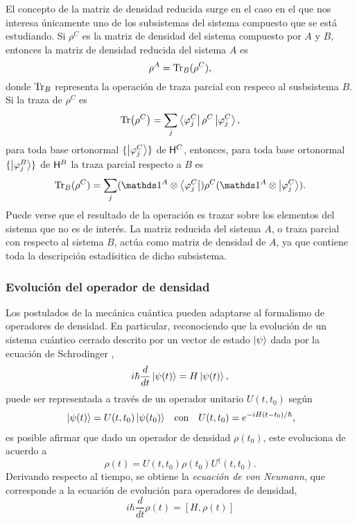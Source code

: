 El concepto de la matriz de densidad reducida surge en el caso en el que nos interesa únicamente uno de los subsistemas del sistema compuesto que se está estudiando. Si $\rho^{C}$ es la matriz de densidad del sistema compuesto por $A$ y $B$, entonces la matriz de densidad reducida del sistema $A$ es
\begin{equation*}
    \rho^{A}=\Tr_{B}(\rho^{C}),
\end{equation*}
donde $\Tr_{B}$ representa la operación de traza parcial con respeco al susbsistema $B$. Si la traza de $\rho^{C}$ es 
\begin{equation*}
    \Tr(\rho^{C})=\sum_{j}\bra{\varphi^{C}_{j}}\rho^{C}\ket{\varphi^{C}_{j}},
\end{equation*}
para toda base ortonormal $\{\ket{\varphi^{C}_{j}}\}$ de ${\sf H}^{C}$, entonces, para toda base ortonormal $\{\ket{\varphi^{B}_{j}}\}$ de ${\sf H}^{B}$  la traza parcial respecto a $B$ es
\begin{equation*}
    \Tr_{B}(\rho^{C})=\sum_{j}(\Id^{A}\otimes \bra{\varphi^{C}_{j}})\rho^{C}(\Id^{A}\otimes \ket{\varphi^{C}_{j}}).
\end{equation*}
Puede verse que el resultado de la operación es trazar sobre los elementos del sistema que no es de interés. La matriz reducida del sistema $A$, o traza parcial con respecto al sistema $B$, actúa como matriz de densidad de $A$, ya que contiene toda la descripción estadísitica de dicho subsistema.
\subsubsection{Evolución del operador de densidad}
Los postulados de la mecánica cuántica pueden adaptarse al formalismo de operadores de densidad. En particular, reconociendo que la evolución de un sistema cuántico cerrado descrito por un vector de estado $\ket{\psi}$ dada por la ecuación de Schrodinger \cite{Breuer},
\begin{equation*}
    i\hbar\frac{d}{dt}\ket{\psi(t)}=H\ket{\psi(t)},
\end{equation*}
puede ser representada a través de un operador unitario $U(t,t_{0})$ según
\begin{align*}
    \ket{\psi(t)}=U(t,t_{0})\ket{\psi(t_{0})} && \text{con} && U(t,t_{0})=e^{-iH(t-t_{0})/\hbar}\rlap{,}
\end{align*}
es posible afirmar que dado un operador de densidad $\rho(t_{0})$, este evoluciona de acuerdo a
\begin{equation*}
    \rho(t)=U(t,t_{0})\rho(t_{0})U^{\dagger}(t,t_{0}).
\end{equation*}
Derivando respecto al tiempo, se obtiene la \textit{ecuación de von Neumann}, que corresponde a la ecuación de evolución para operadores de densidad,
\begin{equation}\label{eq:vonNeumann}
    i\hbar\frac{d}{d t} \rho(t)=[H,\rho(t)]
\end{equation}
